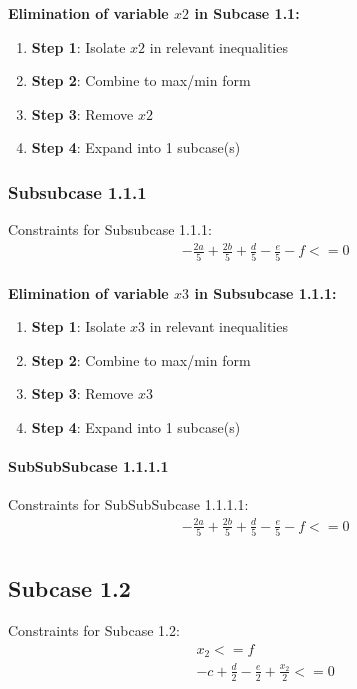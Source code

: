 \documentclass{article}
\begin{document}
\textbf{Elimination of variable $x2$ in Subcase 1.1:}

\begin{enumerate}
\item \textbf{Step 1}: Isolate $x2$ in relevant inequalities
\item \textbf{Step 2}: Combine to max/min form
\item \textbf{Step 3}: Remove $x2$
\item \textbf{Step 4}: Expand into 1 subcase(s)
\end{enumerate}

\subsubsection{Subsubcase 1.1.1}

Constraints for Subsubcase 1.1.1:
\begin{align}
& - \frac{2 a}{5} + \frac{2 b}{5} + \frac{d}{5} - \frac{e}{5} - f <= 0 \\
\end{align}

\textbf{Elimination of variable $x3$ in Subsubcase 1.1.1:}

\begin{enumerate}
\item \textbf{Step 1}: Isolate $x3$ in relevant inequalities
\item \textbf{Step 2}: Combine to max/min form
\item \textbf{Step 3}: Remove $x3$
\item \textbf{Step 4}: Expand into 1 subcase(s)
\end{enumerate}

\paragraph{SubSubSubcase 1.1.1.1}

Constraints for SubSubSubcase 1.1.1.1:
\begin{align}
& - \frac{2 a}{5} + \frac{2 b}{5} + \frac{d}{5} - \frac{e}{5} - f <= 0 \\
\end{align}

\subsection{Subcase 1.2}

Constraints for Subcase 1.2:
\begin{align}
& x_{2} <= f \\
& - c + \frac{d}{2} - \frac{e}{2} + \frac{x_{2}}{2} <= 0 \\
\end{align}
\end{document}
